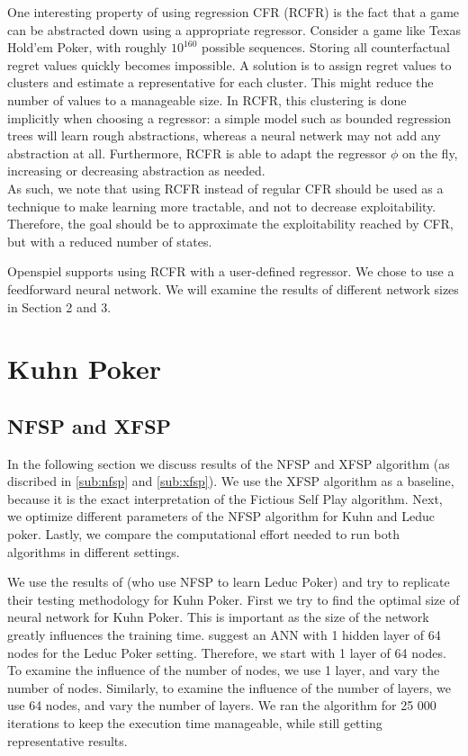\documentclass[10pt,a4paper]{article}
\begin{document}
One interesting property of using regression CFR (RCFR) is the fact that a game can be abstracted down using a appropriate regressor. Consider a game like Texas Hold'em Poker, with roughly $10^{160}$ possible sequences. Storing all counterfactual regret values quickly becomes impossible. A solution is to assign regret values to clusters and estimate a representative for each cluster. This might reduce the number of values to a manageable size. In RCFR, this clustering is done implicitly when choosing a regressor: a simple model such as bounded regression trees will learn rough abstractions, whereas a neural netwerk may not add any abstraction at all. Furthermore, RCFR is able to adapt the regressor $\phi$ on the fly, increasing or decreasing abstraction as needed.\\

As such, we note that using RCFR instead of regular CFR should be used as a technique to make learning more tractable, and not to decrease exploitability. Therefore, the goal should be to approximate the exploitability reached by CFR, but with a reduced number of states.

Openspiel supports using RCFR with a user-defined regressor. We chose to use a feedforward neural network. We will examine the results of different network sizes in Section 2 and 3.


\section{Kuhn Poker}
\subsection{NFSP and XFSP}
In the following section we discuss results of the NFSP and XFSP algorithm (as discribed in \ref{sub:nfsp} and \ref{sub:xfsp}). We use the XFSP algorithm as a baseline, because it is the exact interpretation of the Fictious Self Play algorithm. Next, we optimize different parameters of the NFSP algorithm for Kuhn and Leduc poker. Lastly, we compare the computational effort needed to run both algorithms in different settings.

We use the results of \citeauthor{heinrichphd} \cite{heinrichphd} (who use NFSP to learn Leduc Poker) and try to replicate their testing methodology for Kuhn Poker.
First we try to find the optimal size of neural network for Kuhn Poker. This is important as the size of the network greatly influences the training time.
\citeauthor{heinrichphd} \cite{heinrichphd} suggest an ANN with 1 hidden layer of 64 nodes for the Leduc Poker setting. Therefore, we start with 1 layer of 64 nodes. To examine the influence of the number of nodes, we use 1 layer, and vary the number of nodes. Similarly, to examine the influence of the number of layers, we use 64 nodes, and vary the number of layers.
We ran the algorithm for 25 000 iterations to keep the execution time manageable, while still getting representative results.
\end{document}
